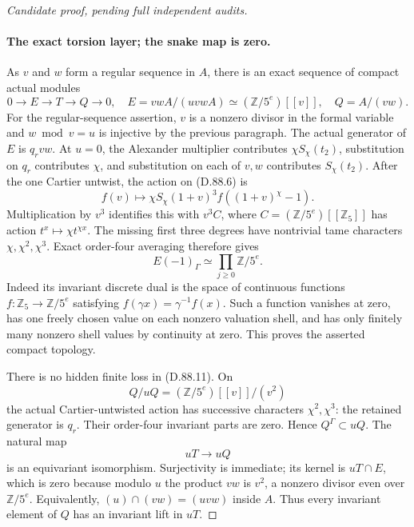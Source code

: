 \begin{proof}[Candidate proof, pending full independent audits]
\paragraph{The exact torsion layer; the snake map is zero.}
As \(v\) and \(w\) form a regular sequence in \(A\),
there is an exact sequence of compact actual modules
\[
 0\longrightarrow E\longrightarrow T\longrightarrow Q
      \longrightarrow0,
 \quad E=vwA/(uvwA)\simeq(\mathbb Z/5^e)[[v]],
 \quad Q=A/(vw).                                      \tag{D.88.9}
\]
For the regular-sequence assertion, \(v\) is a nonzero
 divisor in the formal variable and \(w\bmod v=u\) is
injective by the previous paragraph. The actual generator of
\(E\) is \(q_rvw\). At \(u=0\), the Alexander multiplier
contributes \(\chi S_\chi(t_2)\), substitution on \(q_r\)
contributes \(\chi\), and substitution on each of \(v,w\)
contributes \(S_\chi(t_2)\). After the one Cartier untwist,
the action on (D.88.6) is
\[
 f(v)\longmapsto\chi S_\chi(1+v)^3
                         f((1+v)^\chi-1).             \tag{D.88.10}
\]
Multiplication by \(v^3\) identifies this with
\(v^3C\), where \(C=(\mathbb Z/5^e)[[\mathbb Z_5]]\)
has action \(t^x\mapsto\chi t^{\chi x}\).
The missing first three degrees have nontrivial tame
characters \(\chi,\chi^2,\chi^3\). Exact order-four
averaging therefore gives
\[
                     E(-1)_\Gamma\simeq
                           \prod_{j\ge0}\mathbb Z/5^e.
                                                               \tag{D.88.11}
\]
Indeed its invariant discrete dual is the space of continuous
functions \(f:\mathbb Z_5\to\mathbb Z/5^e\) satisfying
\(f(\gamma x)=\gamma^{-1}f(x)\). Such a function vanishes
at zero, has one freely chosen value on each nonzero valuation
shell, and has only finitely many nonzero shell values by
continuity at zero. This proves the asserted compact topology.

There is no hidden finite loss in (D.88.11). On
\[
             Q/uQ=(\mathbb Z/5^e)[[v]]/(v^2)
\]
the actual Cartier-untwisted action has successive characters
\(\chi^2,\chi^3\): the retained generator is \(q_r\).
Their order-four invariant parts are zero. Hence
\(Q^\Gamma\subset uQ\). The natural map
\[
                              uT\longrightarrow uQ
                                                               \tag{D.88.12}
\]
is an equivariant isomorphism. Surjectivity is immediate;
its kernel is \(uT\cap E\), which is zero because modulo
\(u\) the product \(vw\) is \(v^2\), a nonzero divisor
even over \(\mathbb Z/5^e\). Equivalently,
\((u)\cap(vw)=(uvw)\) inside \(A\).
Thus every invariant element of \(Q\) has an invariant
lift in \(uT\).


\end{proof}
